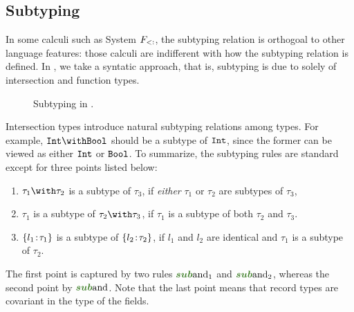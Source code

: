 \subsection{Subtyping}




In some calculi such as System $ F_{<:} $, the subtyping relation is
orthogoal to other language features: those calculi are indifferent with how the
subtyping relation is defined. In \name, we take a syntatic approach, that is,
subtyping is due to solely of intersection and function types.

\begin{figure*}

\caption{Subtyping in \name.}
\end{figure*}


Intersection types introduce natural subtyping relations among types. For
example, $ \Int \andop \Bool $ should be a subtype of $ \texttt{Int} $, since the
former can be viewed as either $ \texttt{Int} $ or $ \texttt{Bool} $. To summarize, the
subtyping rules are standard except for three points listed below:
\begin{enumerate}
\item $ \tau_1 \andop \tau_2 $ is a subtype of $ \tau_3 $, if \emph{either} $ \tau_1 $ or
  $ \tau_2 $ are subtypes of $ \tau_3 $,

\item $ \tau_1 $ is a subtype of $ \tau_2 \andop \tau_3 $, if $ \tau_1 $ is a subtype of
  both $ \tau_2 $ and $ \tau_3 $.

\item $ \{ l_1 \!:\! \tau_1 \} $ is a subtype of $ \{ l_2 \!:\! \tau_2 \} $, if
  $ l_1 $ and $ l_2 $ are identical and $ \tau_1 $ is a subtype of $ \tau_2 $.
\end{enumerate}
The first point is captured by two rules $ \rulelabelsubandleft $ and
$ \rulelabelsubandright $, whereas the second point by $ \rulelabelsuband $. Note that the
last point means that record types are covariant in the type of the fields.

